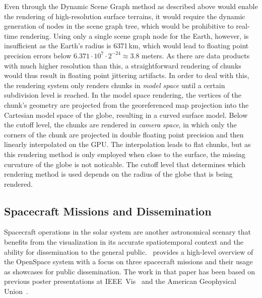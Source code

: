 Even through the Dynamic Scene Graph method as described above would enable the rendering of high-resolution surface terrains, it would require the dynamic generation of nodes in the scene graph tree, which would be prohibitive to real-time rendering.  Using only a single scene graph node for the Earth, however, is insufficient as the Earth's radius is 6371\,km, which would lead to floating point precision errors below $6.371\cdot 10^7 \cdot 2^{-24} \approx 3.8$ meters.  As there are data products with much higher resolution than this, a straightforward rendering of chunks would thus result in floating point jittering artifacts.  In order to deal with this, the rendering system only renders chunks in \emph{model space} until a certain subdivision level is reached.  In the model space rendering, the vertices of the chunk's geometry are projected from the georeferenced map projection into the Cartesian model space of the globe, resulting in a curved surface model.  Below the cutoff level, the chunks are rendered in \emph{camera space}, in which only the corners of the chunk are projected in double floating point precision and then linearly interpolated on the GPU.  The interpolation leads to flat chunks, but as this rendering method is only employed when close to the surface, the missing curvature of the globe is not noticable.  The cutoff level that determines which rendering method is used depends on the radius of the globe that is being rendered.





\subsection{Spacecraft Missions and Dissemination} \label{contributions:astro:sc}
Spacecraft operations in the solar system are another astronomical scenary that benefits from the visualization in its accurate spatiotemporal context and the ability for dissemination to the general public.  \paperOS\ provides a high-level overview of the OpenSpace system with a focus on three spacecraft missions and their usage as showcases for public dissemination.  The work in that paper has been based on previous poster presentations at IEEE~Vis~\cite{bock15openspace} and the American Geophysical Union~\cite{bock15bopenspace}.

